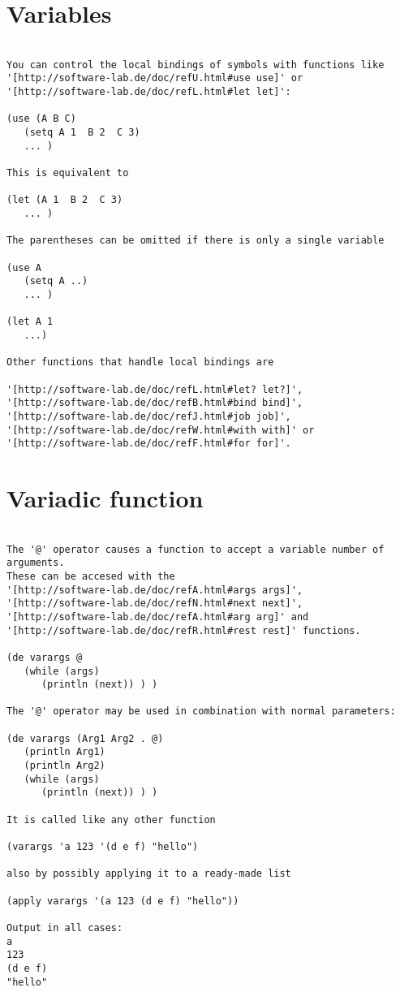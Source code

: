 \section*{Variables}

\begin{verbatim}

You can control the local bindings of symbols with functions like
'[http://software-lab.de/doc/refU.html#use use]' or
'[http://software-lab.de/doc/refL.html#let let]':

(use (A B C)
   (setq A 1  B 2  C 3)
   ... )

This is equivalent to

(let (A 1  B 2  C 3)
   ... )

The parentheses can be omitted if there is only a single variable

(use A
   (setq A ..)
   ... )

(let A 1
   ...)

Other functions that handle local bindings are

'[http://software-lab.de/doc/refL.html#let? let?]',
'[http://software-lab.de/doc/refB.html#bind bind]',
'[http://software-lab.de/doc/refJ.html#job job]',
'[http://software-lab.de/doc/refW.html#with with]' or
'[http://software-lab.de/doc/refF.html#for for]'.

\end{verbatim}

\section*{Variadic function}

\begin{verbatim}

The '@' operator causes a function to accept a variable number of arguments.
These can be accesed with the
'[http://software-lab.de/doc/refA.html#args args]',
'[http://software-lab.de/doc/refN.html#next next]',
'[http://software-lab.de/doc/refA.html#arg arg]' and
'[http://software-lab.de/doc/refR.html#rest rest]' functions.

(de varargs @
   (while (args)
      (println (next)) ) )

The '@' operator may be used in combination with normal parameters:

(de varargs (Arg1 Arg2 . @)
   (println Arg1)
   (println Arg2)
   (while (args)
      (println (next)) ) )

It is called like any other function

(varargs 'a 123 '(d e f) "hello")

also by possibly applying it to a ready-made list

(apply varargs '(a 123 (d e f) "hello"))

Output in all cases:
a
123
(d e f)
"hello"

\end{verbatim}

